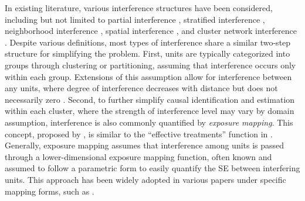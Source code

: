 In existing literature, various interference structures have been considered, including but not limited to partial interference \citep{sobel2006randomized, qu2021efficient}, stratified interference \citep{hudgens2008toward}, neighborhood interference \citep{forastiere2021identification}, spatial interference \citep{leung2022rate}, and cluster network interference \citep{bargagli2020heterogeneous}. Despite various definitions, most types of interference share a similar two-step structure for simplifying the problem. First, units are typically categorized into groups through clustering or partitioning, assuming that interference occurs only within each group. Extensions of this assumption allow for interference between any units, where degree of interference decreases with distance but does not necessarily zero \citep{leung2022rate, leung2022causal}. 
Second, to further simplify causal identification and estimation within each cluster, where the strength of interference level may vary by domain assumption, interference is also commonly quantified by \textit{exposure mapping}. This concept, proposed by \citet{aronow2017estimating}, is similar to the ``effective treatments'' function in \citet{manski2013identification}. Generally, exposure mapping assumes that interference among units is passed through a lower-dimensional exposure mapping function, often known and assumed to follow a parametric form to easily quantify the \acrshort{SE}  between interfering units. This approach has been widely adopted in various papers under specific mapping forms, such as \citet{su2019modelling,qu2021efficient, viviano2024policy}.

